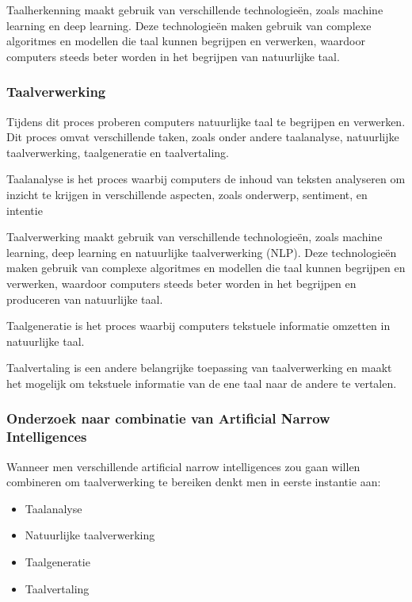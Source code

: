 Taalherkenning maakt gebruik van verschillende technologieën, zoals machine learning en deep learning. Deze technologieën maken gebruik van complexe algoritmes en modellen die taal kunnen begrijpen en verwerken, waardoor computers steeds beter worden in het begrijpen van natuurlijke taal.

\subsubsection{Taalverwerking}

Tijdens dit proces proberen computers natuurlijke taal te begrijpen en verwerken. Dit proces omvat verschillende taken, zoals onder andere taalanalyse, natuurlijke taalverwerking, taalgeneratie en taalvertaling.

Taalanalyse is het proces waarbij computers de inhoud van teksten analyseren om inzicht te krijgen in verschillende aspecten, zoals onderwerp, sentiment, en intentie

Taalverwerking maakt gebruik van verschillende technologieën, zoals machine learning, deep learning en natuurlijke taalverwerking (NLP). Deze technologieën maken gebruik van complexe algoritmes en modellen die taal kunnen begrijpen en verwerken, waardoor computers steeds beter worden in het begrijpen en produceren van natuurlijke taal.
 
Taalgeneratie is het proces waarbij computers tekstuele informatie omzetten in natuurlijke taal.

Taalvertaling is een andere belangrijke toepassing van taalverwerking en maakt het mogelijk om tekstuele informatie van de ene taal naar de andere te vertalen.

\subsubsection{Onderzoek naar combinatie van Artificial Narrow Intelligences}

Wanneer men verschillende artificial narrow intelligences zou gaan willen combineren om taalverwerking te bereiken denkt men in eerste instantie aan:

\begin{itemize}
    \item Taalanalyse
    \item Natuurlijke taalverwerking
    \item Taalgeneratie
    \item Taalvertaling
\end{itemize}

